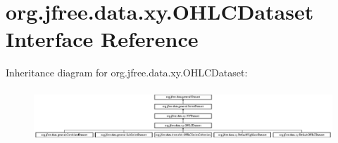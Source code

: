 \hypertarget{interfaceorg_1_1jfree_1_1data_1_1xy_1_1_o_h_l_c_dataset}{}\section{org.\+jfree.\+data.\+xy.\+O\+H\+L\+C\+Dataset Interface Reference}
\label{interfaceorg_1_1jfree_1_1data_1_1xy_1_1_o_h_l_c_dataset}
Inheritance diagram for org.\+jfree.\+data.\+xy.\+O\+H\+L\+C\+Dataset\+:\begin{figure}[H]
\begin{center}
\leavevmode
\includegraphics[height=1.985816cm]{interfaceorg_1_1jfree_1_1data_1_1xy_1_1_o_h_l_c_dataset}
\end{center}
\end{figure}
